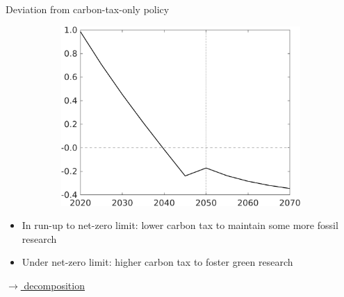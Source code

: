 \documentclass[11pt,aspectratio=169]{beamer}
\begin{document}
\begin{frame}{Deviation from carbon-tax-only policy}
\begin{figure}
\begin{subfigure}{0.4\textwidth}
		\includegraphics[width=1\textwidth]{../codding_model/own_basedOnFried/optimalPol_010922_revision/figures/all_13Sept22_Tplus30/sffsg_OPT_T_NoTaus_COMPtaulPer_regime4_spillover0_knspil0_noskill0_sep0_xgrowth0_PV1_etaa0.79.png}
	\end{subfigure}
\end{figure}
\vspace{3mm}
\begin{block}{}
	\begin{itemize}
 \item In run-up to net-zero limit: lower carbon tax to maintain some more fossil research
\item Under net-zero limit: higher carbon tax to foster green research
	\end{itemize}
\end{block}	

\vspace{-3mm}
\hfill	\hyperlink{decomp}{\tiny{$\rightarrow$ decomposition}}
\hypertarget{mec}{}
\end{frame}





\hypertarget{conc}{}
\end{document}
